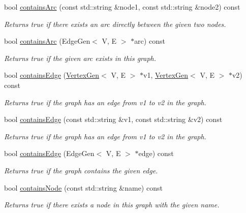 \begin{DoxyCompactItemize}
bool \mbox{\hyperlink{classGraph_a515e45aae316b581bf1cf168541f4f44}{contains\+Arc}} (const std\+::string \&node1, const std\+::string \&node2) const
\begin{DoxyCompactList}\small\item\em Returns true if there exists an arc directly between the given two nodes. \end{DoxyCompactList}\item 
bool \mbox{\hyperlink{classGraph_acf7a659ddd8a143836b91b01c200ee8a}{contains\+Arc}} (Edge\+Gen$<$ V, E $>$ $\ast$arc) const
\begin{DoxyCompactList}\small\item\em Returns true if the given arc exists in this graph. \end{DoxyCompactList}\item 
bool \mbox{\hyperlink{classBasicGraphGen_a6ce3804a90bf7006e7bc78e1a51a1365}{contains\+Edge}} (\mbox{\hyperlink{classVertexGen}{Vertex\+Gen}}$<$ V, E $>$ $\ast$v1, \mbox{\hyperlink{classVertexGen}{Vertex\+Gen}}$<$ V, E $>$ $\ast$v2) const
\begin{DoxyCompactList}\small\item\em Returns true if the graph has an edge from v1 to v2 in the graph. \end{DoxyCompactList}\item 
bool \mbox{\hyperlink{classBasicGraphGen_a4475808d2ed8a45b9fceecc2c6081fc3}{contains\+Edge}} (const std\+::string \&v1, const std\+::string \&v2) const
\begin{DoxyCompactList}\small\item\em Returns true if the graph has an edge from v1 to v2 in the graph. \end{DoxyCompactList}\item 
bool \mbox{\hyperlink{classBasicGraphGen_ad41e772ab382972e1c54ab6df781dd82}{contains\+Edge}} (Edge\+Gen$<$ V, E $>$ $\ast$edge) const
\begin{DoxyCompactList}\small\item\em Returns true if the graph contains the given edge. \end{DoxyCompactList}\item 
bool \mbox{\hyperlink{classGraph_ac0beb77e8a238c2898ab851df71eeefe}{contains\+Node}} (const std\+::string \&name) const
\begin{DoxyCompactList}\small\item\em Returns true if there exists a node in this graph with the given name. \end{DoxyCompactList}\item 

\end{DoxyCompactItemize}
